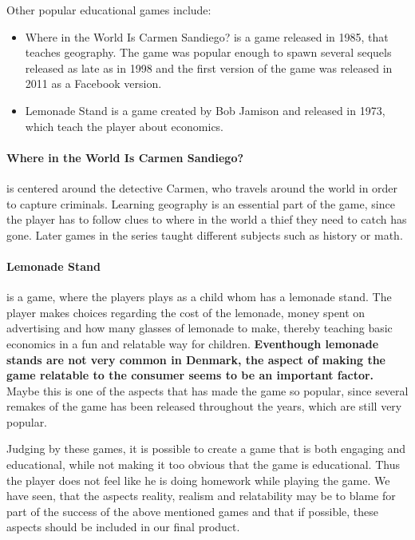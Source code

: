 Other popular educational games include:
\begin{itemize}
	\item Where in the World Is Carmen Sandiego? is a game released in 1985, that teaches geography. The game was popular enough to spawn several sequels released as late as in 1998 and the first version of the game was released in 2011 as a Facebook version.\cite{carmensandiego}
	\item Lemonade Stand is a game created by Bob Jamison and released in 1973, which teach the player about economics.\cite{lemonadestand}
\end{itemize}

\paragraph{Where in the World Is Carmen Sandiego?} is centered around the detective Carmen, who travels around the world in order to capture criminals. Learning geography is an essential part of the game, since the player has to follow clues to where in the world a thief they need to catch has gone. Later games in the series taught different subjects such as history or math.

\paragraph{Lemonade Stand} is a game, where the players plays as a child whom has a lemonade stand.
The player makes choices regarding the cost of the lemonade, money spent on advertising and how many glasses of lemonade to make, thereby teaching basic economics in a fun and relatable way for children. \textbf{Eventhough lemonade stands are not very common in Denmark, the aspect of making the game relatable to the consumer seems to be an important factor.} Maybe this is one of the aspects that has made the game so popular, since several remakes of the game has been released throughout the years, which are still very popular.\newline

Judging by these games, it is possible to create a game that is both engaging and educational, while not making it too obvious that the game is educational. Thus the player does not feel like he is doing homework while playing the game. We have seen, that the aspects reality, realism and relatability may be to blame for part of the success of the above mentioned games and that if possible, these aspects should be included in our final product.

